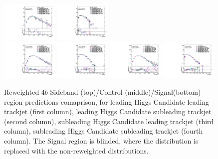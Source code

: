 \begin{figure}[htbp!]
\begin{center}
\includegraphics[width=0.24\textwidth,angle=-90]{figures/boosted/AppendixReweight/Compare/Data_FourTag_Control_directcompare_sublHCand_trk0_Pt_1.pdf}
\includegraphics[width=0.24\textwidth,angle=-90]{figures/boosted/AppendixReweight/Compare/Data_FourTag_Control_directcompare_sublHCand_trk1_Pt_1.pdf}\\
\includegraphics[width=0.24\textwidth,angle=-90]{figures/boosted/AppendixReweight/Compare/Data_FourTag_Signal_directcompare_leadHCand_trk0_Pt_1.pdf}
\includegraphics[width=0.24\textwidth,angle=-90]{figures/boosted/AppendixReweight/Compare/Data_FourTag_Signal_directcompare_leadHCand_trk1_Pt_1.pdf}
\includegraphics[width=0.24\textwidth,angle=-90]{figures/boosted/AppendixReweight/Compare/Data_FourTag_Signal_directcompare_sublHCand_trk0_Pt_1.pdf}
\includegraphics[width=0.24\textwidth,angle=-90]{figures/boosted/AppendixReweight/Compare/Data_FourTag_Signal_directcompare_sublHCand_trk1_Pt_1.pdf}\\
\caption{Reweighted $4b$ Sideband (top)/Control (middle)/Signal(bottom) region predictions comaprison, for leading Higgs Candidate leading trackjet \pt (first column),  leading Higgs Candidate subleading trackjet \pt (second column), subleading Higgs Candidate leading trackjet \pt (third column), subleading Higgs Candidate subleading trackjet \pt (fourth column). The Signal region is blinded, where the distribution is replaced with the non-reweighted distributions.}
\label{fig:app-rw-comp-4b-trkjet}
\end{center}
\end{figure}

\clearpage
